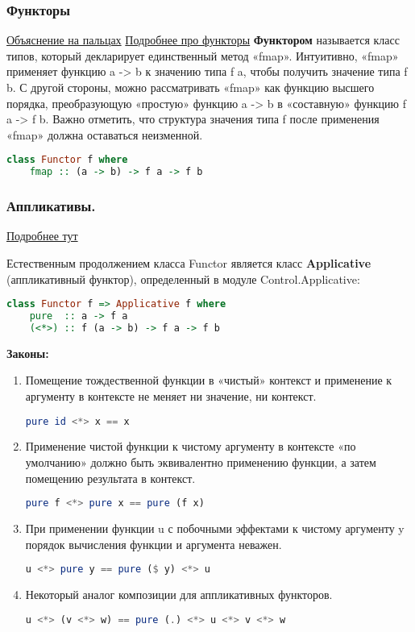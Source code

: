 \documentclass{article}
\begin{document}
\subsubsection{Функторы}

\href{https://habr.com/ru/post/183150/}{Объяснение на пальцах}
\href{http://cmc-msu-ai.github.io/haskell-course/lecture/2013/09/07/functors.html}{Подробнее про функторы}
\textbf{Функтором} называется класс типов, который декларирует единственный метод «fmap». Интуитивно, «fmap» применяет функцию a -> b к значению типа f a, чтобы получить значение типа f b. С другой стороны, можно рассматривать «fmap» как функцию высшего порядка, преобразующую «простую» функцию a -> b в «составную» функцию f a -> f b. Важно отметить, что структура значения типа f после применения «fmap» должна оставаться неизменной.

\begin{lstlisting}[language=Haskell]
class Functor f where
	fmap :: (a -> b) -> f a -> f b
\end{lstlisting}

\subsubsection{Аппликативы.}
\href{http://cmc-msu-ai.github.io/haskell-course/lecture/2013/09/08/applicative-and-monad.html}{Подробнее тут}

Естественным продолжением класса Functor является класс \textbf{Applicative} (аппликативный функтор), определенный в модуле Control.Applicative:

\begin{lstlisting}[language=Haskell]
class Functor f => Applicative f where
	pure  :: a -> f a
	(<*>) :: f (a -> b) -> f a -> f b
\end{lstlisting}

\textbf{Законы:}
\begin{enumerate}
	\item Помещение тождественной функции в «чистый» контекст и применение к аргументу в контексте не меняет ни значение, ни контекст.
	\begin{lstlisting}[language=Haskell]
pure id <*> x == x
	\end{lstlisting}
	\item Применение чистой функции к чистому аргументу в контексте «по умолчанию» должно быть эквивалентно применению функции, а затем помещению результата в контекст.
	\begin{lstlisting}[language=Haskell]
pure f <*> pure x == pure (f x)
	\end{lstlisting}
	\item При применении функции u с побочными эффектами к чистому аргументу y порядок вычисления функции и аргумента неважен.
	\begin{lstlisting}[language=Haskell]
u <*> pure y == pure ($ y) <*> u
	\end{lstlisting}
	\item Некоторый аналог композиции для аппликативных функторов.
	\begin{lstlisting}[language=Haskell]
u <*> (v <*> w) == pure (.) <*> u <*> v <*> w
	\end{lstlisting}
\end{enumerate} 
\end{document}
